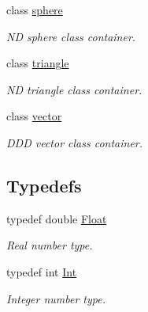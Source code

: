 \begin{DoxyCompactItemize}
class \hyperlink{classddd_1_1sphere}{sphere}
\begin{DoxyCompactList}\small\item\em ND sphere class container. \end{DoxyCompactList}\item 
class \hyperlink{classddd_1_1triangle}{triangle}
\begin{DoxyCompactList}\small\item\em ND triangle class container. \end{DoxyCompactList}\item 
class \hyperlink{classddd_1_1vector}{vector}
\begin{DoxyCompactList}\small\item\em D\+DD vector class container. \end{DoxyCompactList}\end{DoxyCompactItemize}
\subsection*{Typedefs}
\begin{DoxyCompactItemize}
\item 
\mbox{\label{namespaceddd_a900cde04ff126705e451a03e280e1c7a}} 
typedef double \hyperlink{namespaceddd_a900cde04ff126705e451a03e280e1c7a}{Float}
\begin{DoxyCompactList}\small\item\em Real number type. \end{DoxyCompactList}\item 
\mbox{\label{namespaceddd_a50ea76e2b817cc6c6b4539c7f3c4bdad}} 
typedef int \hyperlink{namespaceddd_a50ea76e2b817cc6c6b4539c7f3c4bdad}{Int}
\begin{DoxyCompactList}\small\item\em Integer number type. \end{DoxyCompactList}\end{DoxyCompactItemize}

